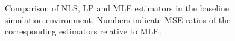 \documentclass[10pt]{article}
\begin{document}
\begin{figure}
  \begin{subfigure}
    \centering
    \resizebox{1.1\linewidth}{!}{}
  \end{subfigure}
  \hfill
  \begin{subfigure}
    \centering
    \resizebox{1.1\linewidth}{!}{}
  \end{subfigure}
  \hfill
  \begin{subfigure}
    \centering
    \resizebox{1.1\linewidth}{!}{}
  \end{subfigure}
  \caption{Comparison of NLS, LP and MLE estimators in the baseline simulation environment. Numbers indicate MSE ratios of the corresponding estimators relative to MLE.}
\end{figure}


\end{document}
